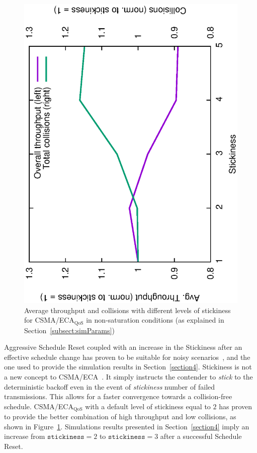 \begin{figure}[tb]
	\centering
		\includegraphics[width=0.7\linewidth, angle=-90]{figures/stickEv-throughput-overallOnly.eps}
		\caption{Average throughput and collisions with different levels of stickiness for CSMA/ECA$_{\text{QoS}}$ in non-saturation conditions (as explained in Section~\ref{subsect:simParams})}
		\label{fig:stickEv-throughput-overallOnly}
	\end{figure}

Aggressive Schedule Reset coupled with an increase in the Stickiness after an effective schedule change has proven to be suitable for noisy scenarios~\cite{sanabria2014high}, and the one used to provide the simulation results in Section~\ref{section4}. Stickiness is not a new concept to CSMA/ECA~\cite{barcelo2011tcf}. It simply instructs the contender to \emph{stick} to the deterministic backoff even in the event of \emph{stickiness} number of failed transmissions. This allows for a faster convergence towards a collision-free schedule. CSMA/ECA$_{\text{QoS}}$ with a default level of stickiness equal to $2$ has proven to provide the better combination of high throughput and low collisions, as shown in Figure~\ref{fig:stickEv-throughput-overallOnly}. Simulations results presented in Section~\ref{section4} imply an increase from ${\texttt{stickiness}}=2$ to ${\texttt{stickiness}}=3$ after a successful Schedule Reset.

